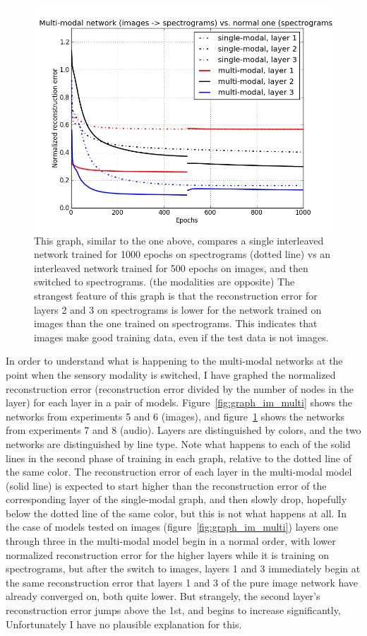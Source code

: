 \documentclass[12pt]{article}
\begin{document}
\begin{doublespacing}
\begin{figure}[p]
\centering
\includegraphics[width=6in]{graph_spect_multi}
\caption{This graph, similar to the one above, compares a single interleaved network trained for 1000 epochs on spectrograms (dotted line) vs an interleaved network trained for 500 epochs on images, and then switched to spectrograms. (the modalities are opposite) The strangest feature of this graph is that the reconstruction error for layers 2 and 3 on spectrograms is lower for the network trained on images than the one trained on spectrograms. This indicates that images make good training data, even if the test data is not images.}
\label{fig:graph_spect_multi}
\end{figure}
	
	In order to understand what is happening to the multi-modal networks at the point when the sensory modality is switched, I have graphed the normalized reconstruction error (reconstruction error divided by the number of nodes in the layer) for each layer in a pair of models. Figure~\ref{fig:graph_im_multi} shows the networks from experiments 5 and 6 (images), and figure~\ref{fig:graph_spect_multi} shows the networks from experiments 7 and 8 (audio). Layers are distinguished by colors, and the two networks are distinguished by line type.  Note what happens to each of the solid lines in the second phase of training in each graph, relative to the dotted line of the same color. The reconstruction error of each layer in the multi-modal model (solid line) is expected to start higher than the reconstruction error of the corresponding layer of the single-modal graph, and then slowly drop, hopefully below the dotted line of the same color, but this is not what happens at all. In the case of models tested on images (figure~\ref{fig:graph_im_multi}) layers one through three in the multi-modal model begin in a normal order, with lower normalized reconstruction error for the higher layers while it is training on spectrograms, but after the switch to images, layers 1 and 3 immediately begin at the same reconstruction error that layers 1 and 3 of the pure image network have already converged on, both quite lower. But strangely, the second layer's reconstruction error jumps above the 1st, and begins to increase significantly, Unfortunately I have no plausible explanation for this. 
	

\end{doublespacing}
\end{document}
